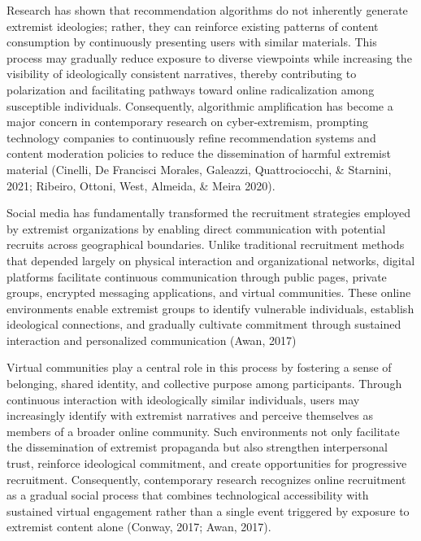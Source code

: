 \documentclass[10pt]{NSP1}
\begin{document}
Research has shown that recommendation algorithms do not inherently generate extremist ideologies; rather, they can reinforce existing patterns of content consumption by continuously presenting users with similar materials. This process may gradually reduce exposure to diverse viewpoints while increasing the visibility of ideologically consistent narratives, thereby contributing to polarization and facilitating pathways toward online radicalization among susceptible individuals. Consequently, algorithmic amplification has become a major concern in contemporary research on cyber-extremism, prompting technology companies to continuously refine recommendation systems and content moderation policies to reduce the dissemination of harmful extremist material (Cinelli, De Francisci Morales, Galeazzi, Quattrociocchi, \& Starnini, 2021; Ribeiro, Ottoni, West, Almeida, \& Meira 2020).

\par\medskip{}\smallskip

Social media has fundamentally transformed the recruitment strategies employed by extremist organizations by enabling direct communication with potential recruits across geographical boundaries. Unlike traditional recruitment methods that depended largely on physical interaction and organizational networks, digital platforms facilitate continuous communication through public pages, private groups, encrypted messaging applications, and virtual communities. These online environments enable extremist groups to identify vulnerable individuals, establish ideological connections, and gradually cultivate commitment through sustained interaction and personalized communication (Awan, 2017)

Virtual communities play a central role in this process by fostering a sense of belonging, shared identity, and collective purpose among participants. Through continuous interaction with ideologically similar individuals, users may increasingly identify with extremist narratives and perceive themselves as members of a broader online community. Such environments not only facilitate the dissemination of extremist propaganda but also strengthen interpersonal trust, reinforce ideological commitment, and create opportunities for progressive recruitment. Consequently, contemporary research recognizes online recruitment as a gradual social process that combines technological accessibility with sustained virtual engagement rather than a single event triggered by exposure to extremist content alone (Conway, 2017; Awan, 2017).
\end{document}
